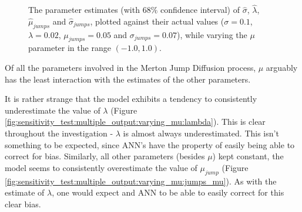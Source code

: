 \documentclass[11pt,oneside,openany,a4paper,english, report, goldenblock
]{usthesis}
\begin{document}
\begin{figure}[h]
{\begin{subfloatrow}
	\end{subfloatrow}}{
		\caption{The parameter estimates (with $68\%$ confidence interval) of $\hat{\sigma}$, $\hat{\lambda}$, $\hat{\mu}_{jumps}$ and $\hat{\sigma}_{jumps}$, plotted against their actual values ($\sigma = 0.1$, $\lambda = 0.02$, $\mu_{jumps} = 0.05$ and $\sigma_{jumps} = 0.07$), while varying the $\mu$ parameter in the range $\left(-1.0, 1.0\right)$.}
		\label{fig:sensitivity_test:multiple_output:varying_mu}}
\end{figure}
Of all the parameters involved in the Merton Jump Diffusion process, $\mu$ arguably has the least interaction with the estimates of the other parameters. 

It is rather strange that the model exhibits a tendency to consistently underestimate the value of $\lambda$ (Figure \ref{fig:sensitivity_test:multiple_output:varying_mu:lambda}). This is clear throughout the investigation - $\lambda$ is almost always underestimated. This isn't something to be expected, since ANN's have the property of easily being able to correct for bias.
Similarly, all other parameters (besides $\mu$) kept constant, the model seems to consistently overestimate the value of $\mu_{jump}$ (Figure \ref{fig:sensitivity_test:multiple_output:varying_mu:jumps_mu}). As with the estimate of $\lambda$, one would expect and ANN to be able to easily correct for this clear bias.
\end{document}
